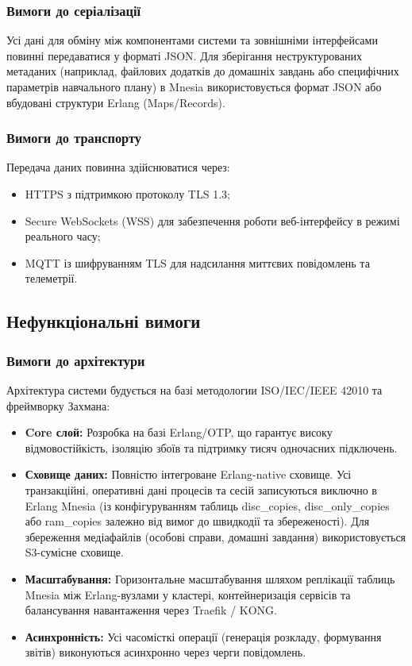 \documentclass{article}
\begin{document}
\subsubsection{Вимоги до серіалізації}
Усі дані для обміну між компонентами системи та зовнішніми інтерфейсами повинні передаватися у форматі JSON. Для зберігання неструктурованих метаданих (наприклад, файлових додатків до домашніх завдань або специфічних параметрів навчального плану) в Mnesia використовується формат JSON або вбудовані структури Erlang (Maps/Records).

\subsubsection{Вимоги до транспорту}
Передача даних повинна здійснюватися через:
\begin{itemize}
    \item HTTPS з підтримкою протоколу TLS 1.3;
    \item Secure WebSockets (WSS) для забезпечення роботи веб-інтерфейсу в режимі реального часу;
    \item MQTT із шифруванням TLS для надсилання миттєвих повідомлень та телеметрії.
\end{itemize}

\subsection{Нефункціональні вимоги}

\subsubsection{Вимоги до архітектури}
Архітектура системи будується на базі методологии ISO/IEC/IEEE 42010 та фреймворку Захмана:
\begin{itemize}
    \item \textbf{Core слой:} Розробка на базі Erlang/OTP, що гарантує високу відмовостійкість, ізоляцію збоїв та підтримку тисяч одночасних підключень.
    \item \textbf{Сховище даних:} Повністю інтегроване Erlang-native сховище. Усі транзакційні, оперативні дані процесів та сесій записуються виключно в Erlang Mnesia (із конфігуруванням таблиць disc\_copies, disc\_only\_copies або ram\_copies залежно від вимог до швидкодії та збереженості). Для збереження медіафайлів (особові справи, домашні завдання) використовується S3-сумісне сховище.
    \item \textbf{Масштабування:} Горизонтальне масштабування шляхом реплікації таблиць Mnesia між Erlang-вузлами у кластері, контейнеризація сервісів та балансування навантаження через Traefik / KONG.
    \item \textbf{Асинхронність:} Усі часомісткі операції (генерація розкладу, формування звітів) виконуються асинхронно через черги повідомлень.
\end{itemize}
\end{document}
